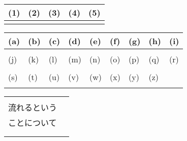 

\begin{table}[htb]
    \begin{center} 
      \begin{tabular}{|p{}|p{}|p{}|p{}|p{}|} \hline
        (1) & (2) & (3) & (4) & (5)\\ \hline \hline
          &  & & &  \\ \hline		
      \end{tabular}
    \end{center}
  \end{table}

  \begin{table}[htb]
    \begin{center} 
      \begin{tabular}{|p{}|p{}|p{}|p{}|p{}|p{}|p{}|p{}|p{}|} \hline
        (a) & (b) & (c) & (d) & (e) & (f) & (g) & (h) & (i)\\ \hline
          &  & & & & & & &  \\ \hline		
        (j) & (k) & (l) & (m) & (n) & (o) & (p) & (q) & (r)\\ \hline
        &  & & & & & & & \\ \hline		
        (s) & (t) & (u) & (v) & (w) & (x) & (y) & (z) & \\ \hline
        &  & & & & & & & \\ \hline	
    \end{tabular}
    \end{center}
  \end{table}

\begin{table}[htb]
  \begin{center} 
    \begin{tabular}{|l|p{}|} \hline
      & \\
      流れるという  & \\
      ことについて & \\ 
            & \\ 
      & \\ \hline
    \end{tabular}
  \end{center}
\end{table}

